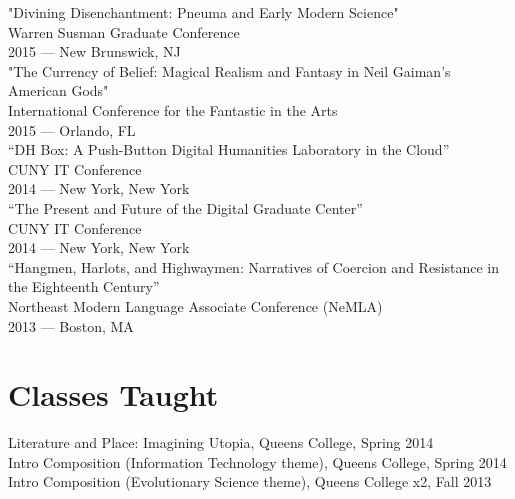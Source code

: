 \documentclass[11pt]{article}
\begin{document}
"Divining Disenchantment: Pneuma and Early Modern Science"\\
Warren Susman Graduate Conference\\
2015 — New Brunswick, NJ\\

"The Currency of Belief: Magical Realism and Fantasy in Neil Gaiman’s American Gods"\\
International Conference for the Fantastic in the Arts\\
2015 — Orlando, FL\\

“DH Box: A Push-Button Digital Humanities Laboratory in the Cloud”\\
CUNY IT Conference\\
2014 — New York, New York\\

“The Present and Future of the Digital Graduate Center”\\
CUNY IT Conference\\
2014 — New York, New York\\

“Hangmen, Harlots, and Highwaymen: Narratives of Coercion and Resistance in the Eighteenth Century”\\
Northeast Modern Language Associate Conference (NeMLA)\\
2013 — Boston, MA\\

\section*{Classes Taught}
\label{sec:orgheadline8}

Literature and Place: Imagining Utopia, Queens College, Spring 2014\\
Intro Composition (Information Technology theme), Queens College, Spring 2014\\
Intro Composition (Evolutionary Science theme), Queens College  x2, Fall 2013\\
\end{document}
